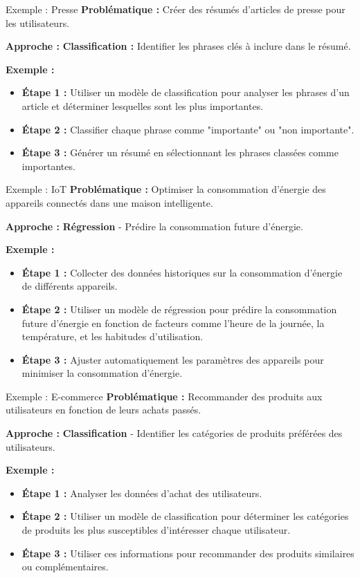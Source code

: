 \begin{frame}{Exemple : Presse}
  \textbf{Problématique :}
  Créer des résumés d'articles de presse pour les utilisateurs.

  \textbf{Approche :}
  \textbf{Classification :} Identifier les phrases clés à inclure dans le résumé.

  \textbf{Exemple :}
  \begin{itemize}
  \item \textbf{Étape 1 :} Utiliser un modèle de classification pour
    analyser les phrases d'un article et déterminer lesquelles sont
    les plus importantes.
  \item \textbf{Étape 2 :} Classifier chaque phrase comme "importante"
    ou "non importante".
  \item \textbf{Étape 3 :} Générer un résumé en sélectionnant les
    phrases classées comme importantes.
  \end{itemize}
  \end{frame}

  \begin{frame}{Exemple : IoT}
    \textbf{Problématique :}
    Optimiser la consommation d'énergie des appareils connectés dans une maison intelligente.

    \textbf{Approche :}
    \textbf{Régression} - Prédire la consommation future d'énergie.

    \textbf{Exemple :}
    \begin{itemize}
    \item \textbf{Étape 1 :} Collecter des données historiques sur la
      consommation d'énergie de différents appareils.
    \item \textbf{Étape 2 :} Utiliser un modèle de régression pour
      prédire la consommation future d'énergie en fonction de facteurs
      comme l'heure de la journée, la température, et les habitudes
      d'utilisation.
    \item \textbf{Étape 3 :} Ajuster automatiquement les paramètres des
      appareils pour minimiser la consommation d'énergie.
    \end{itemize}
\end{frame}

\begin{frame}{Exemple : E-commerce}
    \textbf{Problématique :}
    Recommander des produits aux utilisateurs en fonction de leurs achats passés.

    \textbf{Approche :}
    \textbf{Classification} - Identifier les catégories de produits préférées des utilisateurs.

    \textbf{Exemple :}
  \begin{itemize}
  \item \textbf{Étape 1 :} Analyser les données d'achat des
    utilisateurs.
  \item \textbf{Étape 2 :} Utiliser un modèle de classification pour
    déterminer les catégories de produits les plus susceptibles
    d'intéresser chaque utilisateur.
  \item \textbf{Étape 3 :} Utiliser ces informations pour recommander
    des produits similaires ou complémentaires.
  \end{itemize}
\end{frame}

